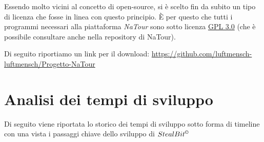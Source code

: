 \documentclass[letterpaper, 11pt]{article}
\begin{document}
Essendo molto vicini al concetto di open-source, si è scelto fin da subito un tipo di licenza che fosse in linea con questo principio. È per questo che tutti i programmi necessari alla piattaforma \emph{NaTour} sono sotto licenza \href{https://www.gnu.org/licenses/gpl-3.0.en.html}{GPL 3.0} (che è possibile consultare anche nella repository di NaTour).

Di seguito riportiamo un link per il download: \url{https://github.com/luftmensch-luftmensch/Progetto-NaTour} \autocite{informazioniRepository}
\section{Analisi dei tempi di sviluppo}
\label{sec:org1c153d6}
Di seguito viene riportata lo storico dei tempi di sviluppo sotto forma di timeline con una vista i passaggi chiave dello sviluppo di \(StealBit^{\copyright}\)
\end{document}
